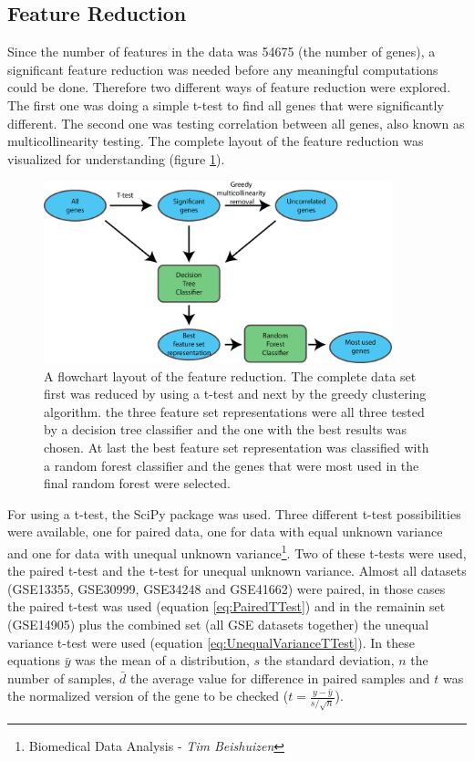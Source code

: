 \documentclass[10pt,a4paper]{article}
\begin{document}
	\subsection{Feature Reduction}
	\label{subsec:MethodsFeatureReduction}
	
	Since the number of features in the data was 54675 (the number of genes), a significant feature reduction was needed before any meaningful computations could be done. Therefore two different ways of feature reduction were explored. The first one was doing a simple t-test to find all genes that were significantly different. The second one was testing correlation between all genes, also known as multicollinearity testing. The complete layout of the feature reduction was visualized for understanding (figure \ref{fig:FeatureReductionLayout}).
	
	\begin{figure}[H]
		\includegraphics[width=0.9\textwidth]{FeatureReductionLayout.png}
		\caption{A flowchart layout of the feature reduction. The complete data set first was reduced by using a t-test and next by the greedy clustering algorithm. the three feature set representations were all three tested by a decision tree classifier and the one with the best results was chosen. At last the best feature set representation was classified with a random forest classifier and the genes that were most used in the final random forest were selected.}
		\label{fig:FeatureReductionLayout}
	\end{figure}
		
	
	For using a t-test, the SciPy package was used. Three different t-test possibilities were available, one for paired data, one for data with equal unknown variance and one for data with unequal unknown variance\footnote{\label{fn:BDA}Biomedical Data Analysis - \textit{Tim Beishuizen}}. Two of these t-tests were used, the paired t-test and the t-test for unequal unknown variance. Almost all datasets (GSE13355, GSE30999, GSE34248 and GSE41662) were paired, in those cases the paired t-test was used (equation \ref{eq:PairedTTest}) and in the remainin set (GSE14905) plus the combined set (all GSE datasets together) the unequal variance t-test were used (equation \ref{eq:UnequalVarianceTTest}). In these equations $\bar{y}$ was the mean of a distribution, $s$ the standard deviation, $n$ the number of samples, $\bar{d}$ the average value for difference in paired samples and $t$ was the normalized version of the gene to be checked ($t = \frac{y - \bar{y}}{s/\sqrt{n}}$).  
	
\end{document}
